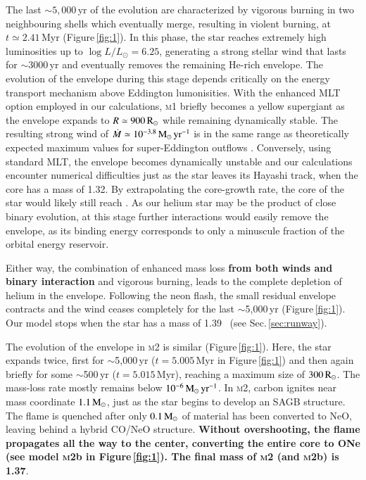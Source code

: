 \documentclass[twocolumn]{aa}
\begin{document}
The last $\sim 5,000$\,yr of the evolution are characterized by vigorous burning in two neighbouring shells which eventually merge, resulting in violent burning, at $t\simeq 2.41$\,Myr (Figure\,\ref{fig:1}). In this phase, the star reaches extremely high luminosities up to $\log{L/L_\odot = 6.25}$, generating   a strong stellar wind that lasts for $\sim3000$\,yr and  eventually removes the remaining He-rich envelope.
The evolution of the envelope during this stage 
depends critically on the energy transport mechanism above Eddington lumonisities. With the enhanced MLT option 
employed in our calculations,  \textsc{m1} briefly 
becomes a yellow supergiant as the envelope  expands to $R\simeq 900\mathrm{\,R_\odot}$ while remaining dynamically stable.
The resulting strong wind of $\dot{M}\simeq10^{-3.8}\mathrm{\,M_{\odot}\,yr^{-1}}$  is in the same range as theoretically expected maximum values for super-Eddington outflows \citep[][]{Owocki:2004zz,Smith2006}.
Conversely, using standard MLT, the envelope becomes dynamically unstable and our calculations encounter numerical difficulties just as the star leaves its Hayashi track, when the core has a mass of 1.32\msun.
By extrapolating the core-growth rate, the core of the star would likely still reach \mch. 
As our helium star may be the product of close binary evolution, at this stage further interactions would easily remove the envelope, as its binding energy corresponds to only a minuscule fraction of the orbital energy reservoir. 

Either way, the combination of enhanced mass loss {\bf from both winds and binary interaction} and vigorous burning, leads to the complete depletion of helium in the envelope. 
Following the neon flash, the small residual envelope contracts and the wind ceases completely for the last $\sim$5,000\,yr (Figure\,\ref{fig:1}). Our model stops when the star has a mass of 1.39\msun~ (see Sec.\,\ref{sec:runway}).  

The evolution of the envelope in \textsc{m2} is similar (Figure\,\ref{fig:1}). Here, 
the star expands twice, first for $\sim$5,000\,yr ($t=5.005$\,Myr in Figure\,\ref{fig:1}) and then again  briefly for some 
$\sim$500\,yr ($t=5.015$\,Myr), reaching a maximum size of $300\mathrm{\,R_\odot}$. The mass-loss rate mostly remains 
below $10^{-6}\mathrm{\,M_{\odot}\,yr^{-1}}$. In \textsc{m2}, carbon ignites near mass coordinate $1.1\mathrm{\,M_\odot}$, 
just as the star begins to develop an SAGB structure. The flame is quenched after only 
$0.1\mathrm{\,M_\odot}$ of material has been converted to NeO, leaving behind a hybrid CO/NeO structure. {\bf Without overshooting, the flame propagates all the way to the center, converting the entire core to ONe (see model \textsc{m2}b in Figure\,\ref{fig:1}). The final mass of \textsc{m2} (and \textsc{m2}b) is 1.37\msun}. 
\end{document}
